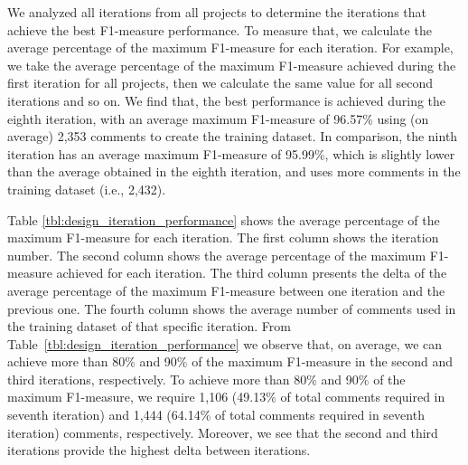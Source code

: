We analyzed all iterations from all projects to determine the iterations that achieve the best F1-measure performance. To measure that, we calculate the average percentage of the maximum F1-measure for each iteration. For example, we take the average percentage of the maximum F1-measure achieved during the first iteration for all projects, then we calculate the same value for all second iterations and so on. We find that, the best performance is achieved during the eighth iteration, with an average maximum F1-measure of 96.57\% using (on average) 2,353 comments to create the training dataset. In comparison, the ninth iteration has an average  maximum F1-measure of 95.99\%, which is slightly lower than the average obtained in the eighth iteration, and uses more comments in the training dataset (i.e., 2,432).

Table \ref{tbl:design_iteration_performance} shows the average percentage of the maximum F1-measure for each iteration. The first column shows the iteration number. The second column shows the average percentage of the maximum F1-measure achieved for each iteration. The third column presents the delta of the average percentage of the maximum F1-measure between one iteration and the previous one. The fourth column shows the average number of comments used in the training dataset of that specific iteration. From Table~\ref{tbl:design_iteration_performance} we observe that, on average, we can achieve more than 80\% and 90\% of the maximum F1-measure in the second and third iterations, respectively. To achieve more than 80\% and 90\% of the maximum F1-measure, we require 1,106 (49.13\% of total comments required in seventh iteration) and 1,444 (64.14\% of total comments required in seventh iteration) comments, respectively. Moreover, we see that the second and third iterations provide the highest delta between iterations.

